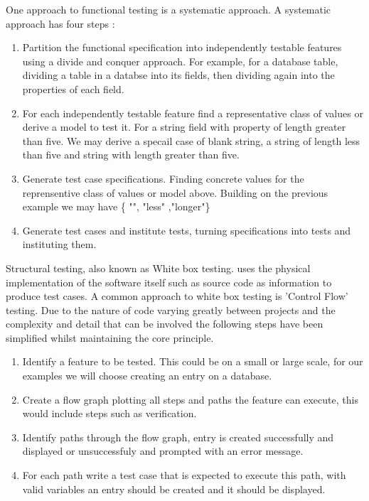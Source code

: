 \documentclass[a4paper,12pt]{article}
\begin{document}
\vspace{5mm}
\par One approach to functional testing is a systematic approach. A systematic approach has four steps :\cite{young2008software}
\vspace{5mm}
\begin{enumerate}
\item Partition the functional specification into independently testable features using a divide and conquer approach. For example, for a database table, dividing a table in a databse into its fields, then dividing again into the properties of each field. 
\item For each independently testable feature find a representative class of values or derive a model to test it. For a string field with property of length greater than five. We may derive a specail case of blank string, a string of length less than five and string with length greater than five.
\item Generate test case specifications. Finding concrete values for the reprensentive class of values or model above. Building on the previous example we may have \{ "", "less" ,"longer"\}
\item Generate test cases and institute tests, turning specifications into tests and instituting them.
\end{enumerate}
\vspace{5mm}
\par Structural testing, also known as White box testing. uses the physical implementation of the software itself such as source code as information to produce test cases. A common approach to white box testing is 'Control Flow' testing. Due to the nature of code varying greatly between projects and the complexity and detail that can be involved the following steps have been simplified whilst maintaining the core principle.
\vspace{5mm}
\begin{enumerate}
\item Identify a feature to be tested. This could be on a small or large scale, for our examples we will choose creating an entry on a database.
\item Create a flow graph plotting all steps and paths the feature can execute, this would include steps such as verification.
\item Identify paths through the flow graph, entry is created successfully and displayed or unsuccessfuly and prompted with an error message.
\item For each path write a test case that is expected to execute this path, with valid variables an entry should be created and it should be displayed.
\end{enumerate}
\end{document}
